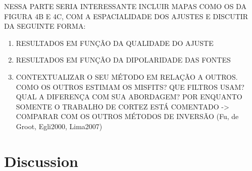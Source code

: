 NESSA PARTE SERIA INTERESSANTE INCLUIR MAPAS COMO OS DA FIGURA 4B E 4C, COM A
ESPACIALIDADE DOS AJUSTES E DISCUTIR DA SEGUINTE FORMA:

\begin{enumerate}
\item RESULTADOS EM FUNÇÃO DA QUALIDADE DO AJUSTE
\item RESULTADOS EM FUNÇÃO DA DIPOLARIDADE DAS FONTES
\item CONTEXTUALIZAR O SEU MÉTODO EM RELAÇÃO A OUTROS. COMO OS OUTROS ESTIMAM
  OS MISFITS? QUE FILTROS USAM? QUAL A DIFERENÇA COM SUA ABORDAGEM? POR
  ENQUANTO SOMENTE O TRABALHO DE CORTEZ ESTÁ COMENTADO -> COMPARAR COM
  OS OUTROS MÉTODOS DE INVERSÃO (Fu, de Groot, Egli2000, Lima2007)
\end{enumerate}


\section{Discussion}


